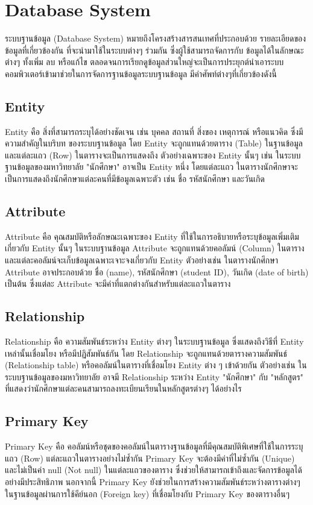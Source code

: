 \section{Database System}
  \qquad ระบบฐานข้อมูล (Database System) หมายถึงโครงสร้างสารสนเทศที่ประกอบด้วย รายละเอียดของข้อมูลที่เกี่ยวข้องกัน
  ที่จะนำมาใช้ในระบบต่างๆ ร่วมกัน ซึ่งผู้ใช้สามารถจัดการกับ ข้อมูลได้ในลักษณะต่างๆ ทั้งเพิ่ม ลบ หรือแก้ไข
  ตลอดจนการเรียกดูข้อมูลส่วนใหญ่จะเป็นการประยุกต์นำเอาระบบคอมพิวเตอร์เข้ามาช่วยในการจัดการฐานข้อมูลระบบฐานข้อมูล
  มีคําศัพท์ต่างๆที่เกี่ยวข้องดังนี้ \cite{DataBaseSystem}
  \subsection{Entity}
    \qquad Entity คือ สิ่งที่สามารถระบุได้อย่างชัดเจน เช่น บุคคล สถานที่ สิ่งของ เหตุการณ์ หรือแนวคิด ซึ่งมีความสำคัญในบริบท
    ของระบบฐานข้อมูล โดย Entity จะถูกแทนด้วยตาราง (Table) ในฐานข้อมูล และแต่ละแถว (Row) ในตารางจะเป็นการแสดงถึง
    ตัวอย่างเฉพาะของ Entity นั้นๆ เช่น ในระบบฐานข้อมูลของมหาวิทยาลัย "นักศึกษา" อาจเป็น Entity หนึ่ง โดยแต่ละแถว
    ในตารางนักศึกษาจะเป็นการแสดงถึงนักศึกษาแต่ละคนที่มีข้อมูลเฉพาะตัว เช่น ชื่อ รหัสนักศึกษา และวันเกิด \cite{Entity}
  \subsection{Attribute}
    \qquad Attribute คือ คุณสมบัติหรือลักษณะเฉพาะของ Entity ที่ใช้ในการอธิบายหรือระบุข้อมูลเพิ่มเติมเกี่ยวกับ Entity นั้นๆ
    ในระบบฐานข้อมูล Attribute จะถูกแทนด้วยคอลัมน์ (Column) ในตาราง และแต่ละคอลัมน์จะเก็บข้อมูลเฉพาะเจาะจงเกี่ยวกับ
    Entity ตัวอย่างเช่น ในตารางนักศึกษา Attribute อาจประกอบด้วย ชื่อ (name), รหัสนักศึกษา (student ID),
    วันเกิด (date of birth) เป็นต้น ซึ่งแต่ละ Attribute จะมีค่าที่แตกต่างกันสำหรับแต่ละแถวในตาราง \cite{Attribute}
  \subsection{Relationship}
    \qquad Relationship คือ ความสัมพันธ์ระหว่าง Entity ต่างๆ ในระบบฐานข้อมูล ซึ่งแสดงถึงวิธีที่ Entity เหล่านั้นเชื่อมโยง
    หรือมีปฏิสัมพันธ์กัน โดย Relationship จะถูกแทนด้วยตารางความสัมพันธ์ (Relationship table)
    หรือคอลัมน์ในตารางที่เชื่อมโยง Entity ต่าง ๆ เข้าด้วยกัน ตัวอย่างเช่น ในระบบฐานข้อมูลของมหาวิทยาลัย อาจมี
    Relationship ระหว่าง Entity "นักศึกษา" กับ "หลักสูตร" ที่แสดงว่านักศึกษาแต่ละคนสามารถลงทะเบียนเรียนในหลักสูตรต่างๆ ได้อย่างไร
  \subsection{Primary Key}
    \qquad Primary Key คือ คอลัมน์หรือชุดของคอลัมน์ในตารางฐานข้อมูลที่มีคุณสมบัติพิเศษที่ใช้ในการระบุแถว (Row)
    แต่ละแถวในตารางอย่างไม่ซ้ำกัน Primary Key จะต้องมีค่าที่ไม่ซ้ำกัน (Unique) และไม่เป็นค่า null (Not null)
    ในแต่ละแถวของตาราง ซึ่งช่วยให้สามารถเข้าถึงและจัดการข้อมูลได้อย่างมีประสิทธิภาพ นอกจากนี้ Primary Key
    ยังช่วยในการสร้างความสัมพันธ์ระหว่างตารางต่างๆ ในฐานข้อมูลผ่านการใช้คีย์นอก (Foreign key) ที่เชื่อมโยงกับ
    Primary Key ของตารางอื่นๆ \cite{PrimaryKey}
